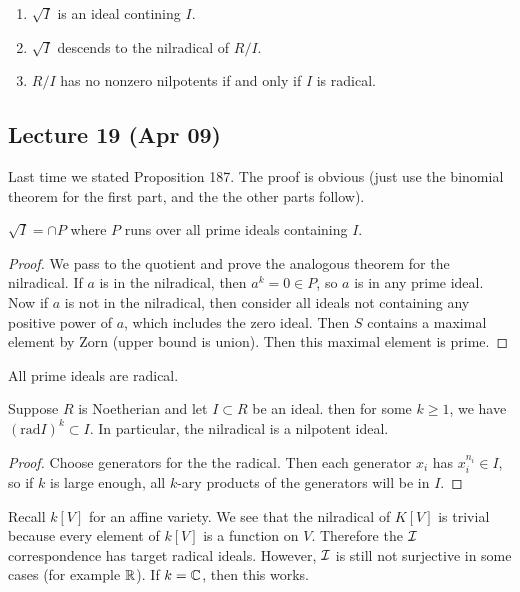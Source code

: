 \documentclass[10pt, twoside]{article}
\begin{document}
    \begin{prop} \begin{enumerate} \item $\sqrt{I}$ is an ideal contining $I$.
    \item $\sqrt{I}$ descends to the nilradical of $R/I$.  \item $R/I$ has no
nonzero nilpotents if and only if $I$ is radical.  \end{enumerate} \end{prop}
        
    \subsection{Lecture 19 (Apr 09)} Last time we stated Proposition 187. The
    proof is obvious (just use the binomial theorem for the first part, and the
    the other parts follow).

    \begin{prop} $\sqrt{I} = \cap P$ where $P$ runs over all prime ideals
        containing $I$.  \begin{proof} We pass to the quotient and prove the
            analogous theorem for the nilradical. If $a$ is in the nilradical,
            then $a^k = 0 \in P$, so $a$ is in any prime ideal. Now if $a$ is
            not in the nilradical, then consider all ideals not containing any
            positive power of $a$, which includes the zero ideal. Then $S$
            contains a maximal element by Zorn (upper bound is union). Then
            this maximal element is prime.  \end{proof} \end{prop}

    \begin{cor} All prime ideals are radical.  \end{cor}

    \begin{prop} Suppose $R$ is Noetherian and let $I \subset R$ be an ideal.
        then for some $k \geq 1$, we have $(\mathrm{rad}I)^k \subset I$. In
        particular, the nilradical is a nilpotent ideal.  \begin{proof} Choose
            generators for the the radical. Then each generator $x_i$ has
            $x_i^{n_i} \in I$, so if $k$ is large enough, all $k$-ary products
            of the generators will be in $I$.  \end{proof} \end{prop}

    Recall $k[V]$ for an affine variety. We see that the nilradical of $K[V]$
    is trivial because every element of $k[V]$ is a function on $V$. Therefore
    the $\mathcal{I}$ correspondence has target radical ideals. However, $\mathcal{I}$ is
    still not surjective in some cases (for example $\mathbb{R}$). If $k = \mathbb{C}$, then
    this works.
\end{document}
